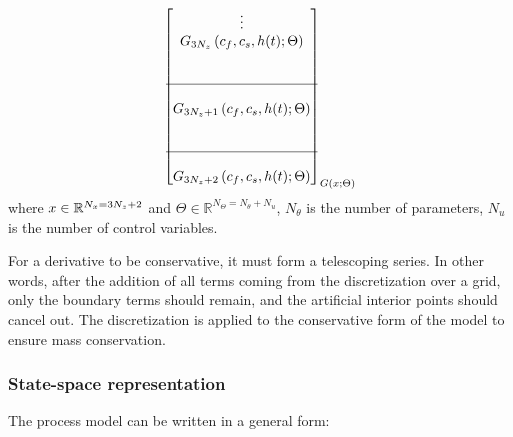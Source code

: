 \documentclass[../Article_Model_Parameters.tex]{subfiles}
\begin{document}
{\begin{align*}
{\begin{bmatrix}
								\vdots\\
								{\color{black}G_{3N_z}} \left( c_f,c_s,{\color{black}h}(t); \Theta \right) \\ 
								\\ \\ \hline \\
								{\color{black}G_{3N_z+1}} \left( c_f,c_s,{\color{black}h}(t); \Theta \right) \\
								\\ \\ \hline \\
								{\color{black}G_{3N_z+2}} \left( c_f,c_s,{\color{black}h}(t); \Theta \right) 
						\end{bmatrix}}_{{\color{black}G} \left( x; \Theta \right)} 
				\end{align*} }
			where ${\color{black}x} \in \mathbb{R}^{N_x = 3N_z+2} $ and $\Theta \in \mathbb{R}^{N_\Theta =  N_{\theta} + N_u } $, $N_{\theta}$ is the number of parameters, $N_{u}$ is the number of control variables.
			
			For a derivative to be conservative, it must form a telescoping series. In other words, after the addition of all terms coming from the discretization over a grid, only the boundary terms should remain, and the artificial interior points should cancel out. The discretization is applied to the conservative form of the model to ensure mass conservation.
			
			\iffalse
			\subsubsection{State-space representation} \label{CH: State_space}
			
			The process model can be written in a general form:
			
\end{document}
